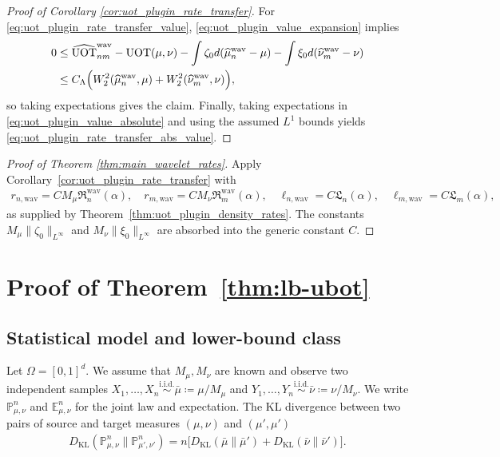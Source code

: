 \documentclass[11pt,reqno]{amsart}
\theoremstyle{definition}
\newcommand{\KL}{\mathrm{KL}}
\renewcommand{\hat}{\widehat}
\begin{document}
\begin{proof}[Proof of Corollary \ref{cor:uot_plugin_rate_transfer}]
For \eqref{eq:uot_plugin_rate_transfer_value}, \eqref{eq:uot_plugin_value_expansion} implies
\begin{align*}
    0
    &\le
    \widehat{\mathrm{UOT}}_{nm}^{\mathrm{wav}}
    - \mathrm{UOT}(\mu,\nu)
    - \int \zeta_0 d(\hat\mu_n^{\mathrm{wav}}-\mu)
    - \int \xi_0 d(\hat\nu_m^{\mathrm{wav}}-\nu)\\
    &\le
    C_\Lambda\Bigl(W_2^2(\hat\mu_n^{\mathrm{wav}},\mu)+W_2^2(\hat\nu_m^{\mathrm{wav}},\nu)\Bigr),
\end{align*}
so taking expectations gives the claim. Finally, taking expectations in \eqref{eq:uot_plugin_value_absolute} and using the assumed $L^1$ bounds yields \eqref{eq:uot_plugin_rate_transfer_abs_value}.
\end{proof}


\begin{proof}[Proof of Theorem \ref{thm:main_wavelet_rates}]
Apply Corollary~\ref{cor:uot_plugin_rate_transfer} with
\begin{align*}
    r_{n,\mathrm{wav}} = C M_\mu\mathfrak R_n^{\mathrm{wav}}(\alpha),
    \quad
    r_{m,\mathrm{wav}} = C M_\nu\mathfrak R_m^{\mathrm{wav}}(\alpha),
    \quad
    \ell_{n,\mathrm{wav}} = C\mathfrak L_n(\alpha),
    \quad
    \ell_{m,\mathrm{wav}} = C\mathfrak L_m(\alpha),
\end{align*}
as supplied by Theorem~\ref{thm:uot_plugin_density_rates}. The constants $M_\mu\|\zeta_0\|_{L^\infty}$ and $M_\nu\|\xi_0\|_{L^\infty}$ are absorbed into the generic constant $C$.
\end{proof}




\section{Proof of Theorem~\ref{thm:lb-ubot}}

\subsection{Statistical model and lower-bound class}

Let $\Omega=[0,1]^d$. We assume that $M_\mu,M_\nu$ are known and observe two independent samples $X_1,\dots,X_n\overset{\mathrm{i.i.d.}}{\sim}\bar\mu\coloneqq\mu/M_\mu$ and $Y_1,\dots,Y_n\overset{\mathrm{i.i.d.}}{\sim}\bar\nu\coloneqq\nu/M_\nu$. We write $\mathbb P_{\mu,\nu}^n$ and $\mathbb E_{\mu,\nu}^n$ for the joint law and expectation. The KL divergence between two pairs of source and target measures $(\mu,\nu)$ and $(\mu',\mu')$
\begin{align}
    \label{eq:iid_kl}
    D_\KL(\mathbb P_{\mu,\nu}^n\|\mathbb P_{\mu',\nu'}^n)
    =
    n\bigl[D_\KL(\bar\mu\|\bar\mu')+D_\KL(\bar\nu\|\bar\nu')\bigr].
\end{align}
\end{document}
